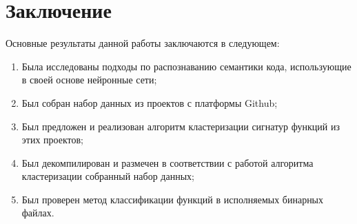 \section*{Заключение}
Основные результаты данной работы заключаются в следующем:
\begin{enumerate}
    \item Была исследованы подходы по распознаванию семантики кода, использующие в своей основе нейронные сети;
    \item Был собран набор данных из проектов с платформы Github;
    \item Был предложен и реализован алгоритм кластеризации сигнатур функций из этих проектов;
    \item Был декомпилирован и размечен в соответствии с работой алгоритма кластеризации собранный набор данных;
    \item Был проверен метод классификации функций в исполняемых бинарных файлах.
\end{enumerate}